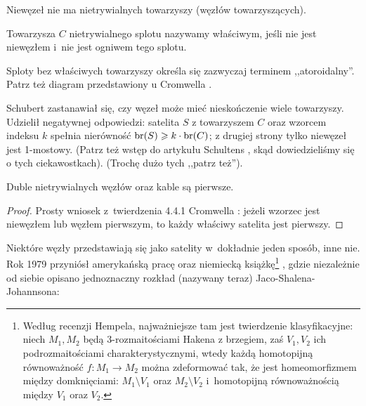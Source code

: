 Niewęzeł nie ma nietrywialnych towarzyszy (węzłów towarzyszących).

\begin{definition}
%
    Towarzysza $C$ nietrywialnego splotu nazywamy właściwym, jeśli nie jest niewęzłem i~nie jest ogniwem tego splotu.
\end{definition}

Sploty bez właściwych towarzyszy określa się zazwyczaj terminem ,,atoroidalny''.
%
Patrz też diagram przedstawiony u Cromwella \cite[s. 83]{cromwell2004}.

Schubert \cite{schubert1954} zastanawiał się, czy węzeł może mieć nieskończenie wiele towarzyszy.
%
Udzielił negatywnej odpowiedzi: satelita $S$ z towarzyszem $C$ oraz wzorcem indeksu $k$ spełnia nierówność $\operatorname{br}(S) \geqslant k \cdot \operatorname{br}(C)$; z drugiej strony tylko niewęzeł jest 1-mostowy.
(Patrz też wstęp do artykułu Schultens \cite{schultens2003}, skąd dowiedzieliśmy się o tych ciekawostkach).
(Trochę dużo tych ,,patrz też'').

\begin{proposition}
%
%
    Duble nietrywialnych węzłów oraz kable są pierwsze.
\end{proposition}

\begin{proof}
    Prosty wniosek z~twierdzenia 4.4.1 Cromwella \cite[s. 84]{cromwell2004}: jeżeli wzorzec jest niewęzłem lub węzłem pierwszym, to każdy właściwy satelita jest pierwszy.
\end{proof}

Niektóre węzły przedstawiają się jako satelity w~dokładnie jeden sposób, inne nie.
Rok 1979 przyniósł amerykańską pracę \cite{jaco1979} oraz niemiecką książkę\footnote{Według recenzji Hempela, najważniejsze tam jest twierdzenie klasyfikacyjne: niech $M_1, M_2$ będą 3-rozmaitościami Hakena  z brzegiem, zaś $V_1, V_2$ ich podrozmaitościami charakterystycznymi, wtedy każdą homotopijną równoważność $f \colon M_1 \to M_2$ można zdeformować tak, że jest homeomorfizmem między domknięciami: $M_1 \setminus V_1$ oraz $M_2 \setminus V_2$ i~homotopijną równoważnością między $V_1$ oraz $V_2$.} \cite{johannson1979}, gdzie niezależnie od siebie opisano jednoznaczny rozkład (nazywany teraz) Jaco-Shalena-Johannsona:
%
%
%
%

